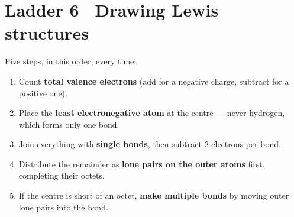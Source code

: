 \documentclass{apchem-worksheet}
\begin{document}
\section*{\sffamily Ladder 6 \textbullet\ Drawing Lewis structures}

Five steps, in this order, every time:

\begin{enumerate}[leftmargin=*,itemsep=0.15em]
  \item Count \textbf{total valence electrons} (add for a negative
        charge, subtract for a positive one).
  \item Place the \textbf{least electronegative atom} at the centre ---
        never hydrogen, which forms only one bond.
  \item Join everything with \textbf{single bonds}, then subtract
        $2$ electrons per bond.
  \item Distribute the remainder as \textbf{lone pairs on the outer
        atoms} first, completing their octets.
  \item If the centre is short of an octet, \textbf{make multiple bonds}
        by moving outer lone pairs into the bond.
\end{enumerate}
\end{document}
